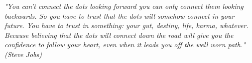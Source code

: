 %
%

\begin{epigrafe}

\textit{"You can't connect the dots looking forward you can only connect them looking backwards. So you have to trust that the dots will somehow connect in your future. You have to trust in something: your gut, destiny, life, karma, whatever. Because believing that the dots will connect down the road will give you the confidence to follow your heart, even when it leads you off the well worn path." (Steve Jobs)}

\end{epigrafe}
